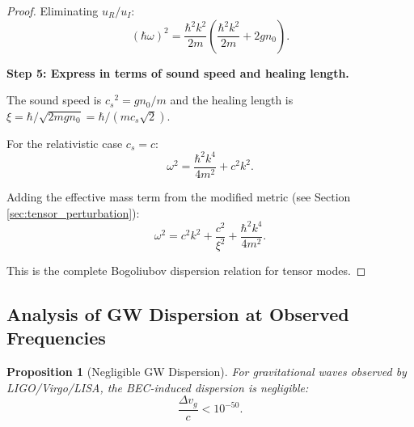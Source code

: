 \documentclass[11pt,a4paper]{article}
\newcommand{\cs}{\ensuremath{c_s}}
\newtheorem{proposition}[theorem]{Proposition}
\theoremstyle{definition}
\theoremstyle{remark}
\begin{document}
\begin{proof}
Eliminating $u_R/u_I$:
\begin{equation}
(\hbar\omega)^2 = \frac{\hbar^2 k^2}{2m}\left(\frac{\hbar^2 k^2}{2m} + 2gn_0\right).
\end{equation}

\textbf{Step 5: Express in terms of sound speed and healing length.}

The sound speed is $\cs^2 = gn_0/m$ and the healing length is $\xi = \hbar/\sqrt{2mgn_0} = \hbar/(m\cs\sqrt{2})$.

For the relativistic case $\cs = c$:
\begin{equation}
\omega^2 = \frac{\hbar^2 k^4}{4m^2} + c^2 k^2.
\end{equation}

Adding the effective mass term from the modified metric (see Section \ref{sec:tensor_perturbation}):
\begin{equation}
\omega^2 = c^2 k^2 + \frac{c^2}{\xi^2} + \frac{\hbar^2 k^4}{4m^2}.
\end{equation}

This is the complete Bogoliubov dispersion relation for tensor modes. \qedhere
\end{proof}

\subsection{Analysis of GW Dispersion at Observed Frequencies}
\label{sec:gw_dispersion}

\begin{proposition}[Negligible GW Dispersion]
\label{prop:negligible_dispersion}
For gravitational waves observed by LIGO/Virgo/LISA, the BEC-induced dispersion is negligible:
\begin{equation}
\frac{\Delta v_g}{c} < 10^{-50}.
\end{equation}
\end{proposition}
\end{document}
